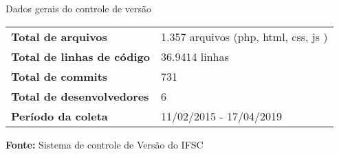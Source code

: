 \begin{quadro}
\caption{Dados gerais do controle de versão}
\label{quadro_git_ingresso}
\centering
\begin{tabular}{ l l }
   \cline{1-1}\cline{2-2}  
    \multicolumn{1}{|p{5.850cm}|}{\textbf{Total de arquivos}} &
    \multicolumn{1}{p{8.217cm}|}{1.357 arquivos (php, html, css, js )}
  \\ 
   \cline{1-1}\cline{2-2}  
    \multicolumn{1}{|p{5.850cm}|}{\textbf{Total de linhas de código}} &
    \multicolumn{1}{p{8.217cm}|}{36.9414 linhas}
  \\    
   \cline{1-1}\cline{2-2}  
    \multicolumn{1}{|p{5.850cm}|}{\textbf{Total de commits}} &
    \multicolumn{1}{p{8.217cm}|}{731}
  \\    
   \cline{1-1}\cline{2-2}  
    \multicolumn{1}{|p{5.850cm}|}{\textbf{Total de desenvolvedores}} &
    \multicolumn{1}{p{8.217cm}|}{6}
  \\     
   \cline{1-1}\cline{2-2}  
    \multicolumn{1}{|p{5.850cm}|}{\textbf{Período da coleta}} &
    \multicolumn{1}{p{8.217cm}|}{11/02/2015 - 17/04/2019}
  \\       
  \hline

 \end{tabular} 
 \par\medskip\textbf{Fonte:} Sistema de controle de Versão do IFSC \par\medskip
\end{quadro}